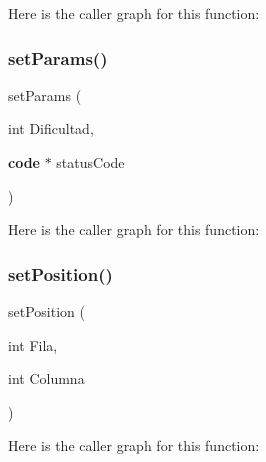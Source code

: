 Here is the caller graph for this function\+:
\label{funciones_8h_a1c6878523e5a0460bdac9b23b0266c12} 
\subsubsection{set\+Params()}
{\footnotesize{} set\+Params (\begin{DoxyParamCaption}\item[{int}]{Dificultad,  }\item[{{\bf code} $\ast$}]{status\+Code }\end{DoxyParamCaption})}

Here is the caller graph for this function\+:
\label{funciones_8h_a85f21b3597c4c3b3622a26ad6f249411} 
\subsubsection{set\+Position()}
{\footnotesize{} set\+Position (\begin{DoxyParamCaption}\item[{int}]{Fila,  }\item[{int}]{Columna }\end{DoxyParamCaption})}

Here is the caller graph for this function\+:
